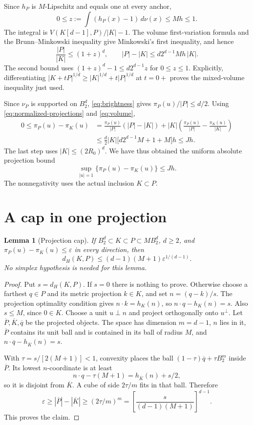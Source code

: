 \documentclass[11pt]{article}
\newtheorem{lemma}[theorem]{Lemma}
\newcommand{\BB}{B_2^d}
\begin{document}
Since $h_P$ is $M$-Lipschitz and equals one at every anchor,
\[
 0\le z:=\int(h_P(x)-1)\,d\nu(x)\le Mh\le1.
\]
The integral is $V(K[d-1],P)/|K|-1$.
The volume first-variation formula and the Brunn--Minkowski inequality give
Minkowski's first inequality, and hence
\begin{equation}\label{eq:volume}
 \frac{|P|}{|K|}\le(1+z)^d,\qquad
 |P|-|K|\le d2^{d-1}Mh\,|K|.
\end{equation}
The second bound uses $(1+z)^d-1\le d2^{d-1}z$ for $0\le z\le1$.
Explicitly, differentiating
$|K+tP|^{1/d}\ge|K|^{1/d}+t|P|^{1/d}$ at $t=0+$
proves the mixed-volume inequality just used.

Since $\nu_P$ is supported on $\BB$, \eqref{eq:brightness} gives
$\pi_P(u)/|P|\le d/2$.
Using \eqref{eq:normalized-projections} and \eqref{eq:volume},
\begin{align*}
 0\le\pi_P(u)-\pi_K(u)
 &=\frac{\pi_P(u)}{|P|}(|P|-|K|)
    +|K|\left(\frac{\pi_P(u)}{|P|}
              -\frac{\pi_K(u)}{|K|}\right)\\
 &\le\frac d2 |K|
       \bigl[d2^{d-1}M+1+M\bigr]h
 \le Jh.
\end{align*}
The last step uses $|K|\le(2R_0)^d$.
We have thus obtained the uniform absolute projection bound
\begin{equation}\label{eq:projection-deficit}
 \sup_{|u|=1}\{\pi_P(u)-\pi_K(u)\}\le Jh.
\end{equation}
The nonnegativity uses the actual inclusion $K\subset P$.

\section{A cap in one projection}

\begin{lemma}[Projection cap]\label{lem:projection-cap}
If $\BB\subset K\subset P\subset M\BB$, $d\ge2$, and
$\pi_P(u)-\pi_K(u)\le\varepsilon$ in every direction, then
\[
 d_H(K,P)\le(d-1)(M+1)\varepsilon^{1/(d-1)}.
\]
No simplex hypothesis is needed for this lemma.
\end{lemma}

\begin{proof}
Put $s=d_H(K,P)$. If $s=0$ there is nothing to prove.
Otherwise choose a farthest $q\in P$ and its metric projection $k\in K$,
and set $n=(q-k)/s$.
The projection optimality condition gives $n\cdot k=h_K(n)$, so
$n\cdot q-h_K(n)=s$. Also $s\le M$, since $0\in K$.
Choose a unit $u\perp n$ and project orthogonally onto $u^\perp$.
Let $\overline P,\overline K,\overline q$ be the projected objects.
The space has dimension $m=d-1$, $n$ lies in it,
$\overline P$ contains its unit ball and is contained in its ball of
radius $M$, and
$n\cdot\overline q-h_{\overline K}(n)=s$.

With $\tau=s/[2(M+1)]<1$, convexity places the ball
$(1-\tau)\overline q+\tau B_2^m$ inside $\overline P$.
Its lowest $n$-coordinate is at least
\[
 n\cdot q-\tau(M+1)=h_{\overline K}(n)+s/2,
\]
so it is disjoint from $\overline K$.
A cube of side $2\tau/m$ fits in that ball. Therefore
\[
 \varepsilon\ge|\overline P|-|\overline K|
 \ge(2\tau/m)^m
 =\left[\frac{s}{(d-1)(M+1)}\right]^{d-1}.
\]
This proves the claim.
\end{proof}
\end{document}

